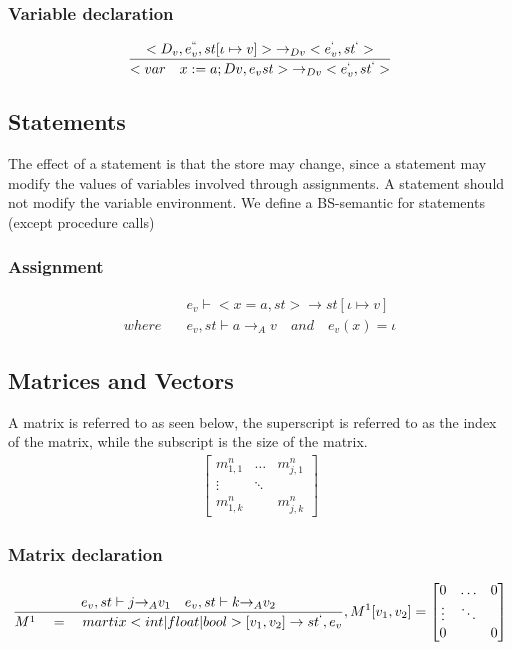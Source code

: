 \subsubsection{Variable declaration}
\begin{equation}
	\frac { <{ D }_{ v },{ e }_{ v }^{ `` },st[\iota \mapsto v]>{ \rightarrow  }_{ Dv }<{ e }_{ v }^{ ` },{ st }^{ ` }> }{ <var\quad x:=a;Dv,{ e }_{ v }st>{ \rightarrow  }_{ Dv }<{ e }_{ v }^{ ` },{ st }^{ ` }> }
\end{equation}

\subsection*{Statements}
The effect of a statement is that the store may change, since a statement may modify the values of variables involved through assignments.
A statement should not modify the variable environment.
We define a BS-semantic for statements (except procedure calls)

\subsubsection{Assignment}
\begin{align*}
	&{ e }_{ v }\vdash <x=a,st>\rightarrow st[\iota \mapsto v]\\
	where\quad &{ e }_{ v },st\vdash a{ \rightarrow  }_{ A }v\quad and\quad  { e }_{ v }(x)=\iota 
\end{align*}

\subsection*{Matrices and Vectors}
A matrix is referred to as seen below, the superscript is referred to as the index of the matrix, while the subscript is the size of the matrix.
\begin{align*}
	\begin{bmatrix} { { m }_{ 1,1 }^{ n } } & \dots  & { m }_{ j,1 }^{ n } \\ \vdots  & \ddots  &  \\ { m }_{ 1,k }^{ n } &  & { m }_{ j,k }^{ n } \end{bmatrix}
\end{align*}

\subsubsection{Matrix declaration}
\begin{equation}
	\frac { { e }_{ v },st\vdash j{ \rightarrow  }_{ A }{ v }_{ 1 }\quad { e }_{ v },st\vdash k{ \rightarrow  }_{ A }{ v }_{ 2 } }{ { M }^{ 1 }\quad =\quad martix<int|float|bool>[{ v }_{ 1 },{ v }_{ 2 }]\rightarrow { st }^{ ` },{ e }_{ v } } ,{ M }^{ 1 }[{ v }_{ 1 },{ v }_{ 2 }]=\begin{bmatrix} { 0 } & \dots  & 0 \\ \vdots  & \ddots  &  \\ 0 &  & 0 \end{bmatrix}
	\end{equation}

